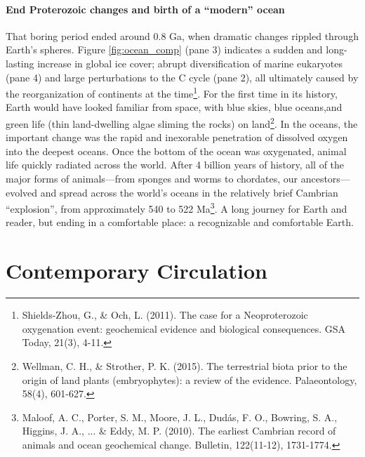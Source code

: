 {\paragraph{End Proterozoic changes and birth of a ``modern'' ocean}
That boring period ended around 0.8 Ga, when dramatic changes rippled through Earth's spheres. Figure \ref{fig:ocean_comp} (pane 3) indicates a sudden and long-lasting increase in global ice cover; abrupt diversification of marine eukaryotes (pane 4) and large perturbations to the C cycle (pane 2), all ultimately caused by the reorganization of continents at the time\footnote{Shields-Zhou, G., \& Och, L. (2011). The case for a Neoproterozoic oxygenation event: geochemical evidence and biological consequences. GSA Today, 21(3), 4-11.}. For the first time in its history, Earth would have looked familiar from space, with blue skies, blue oceans,and green life (thin land-dwelling algae sliming the rocks) on land\footnote{Wellman, C. H., \& Strother, P. K. (2015). The terrestrial biota prior to the origin of land plants (embryophytes): a review of the evidence. Palaeontology, 58(4), 601-627.}. In the oceans, the important change was the rapid and inexorable penetration of dissolved oxygen into the deepest oceans. Once the bottom of the ocean was oxygenated, animal life quickly radiated across the world. After 4 billion years of history, all of the major forms of animals---from sponges and worms to chordates, our ancestors---evolved and spread across the world's oceans in the relatively brief Cambrian ``explosion'', from approximately 540 to 522 Ma\footnote{Maloof, A. C., Porter, S. M., Moore, J. L., Dud\'{a}s, F. O., Bowring, S. A., Higgins, J. A., ... \& Eddy, M. P. (2010). The earliest Cambrian record of animals and ocean geochemical change. Bulletin, 122(11-12), 1731-1774.}. A long journey for Earth and reader, but ending in a comfortable place: a recognizable and comfortable Earth.\\

\section{Contemporary Circulation}  \label{Circulation}
}
